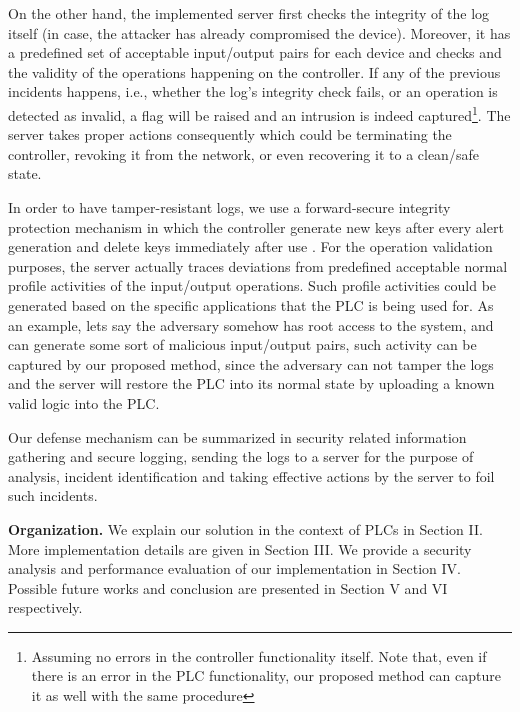 On the other hand, the implemented server first checks the integrity of the log itself (in case, the attacker has already compromised the device). Moreover, it has a predefined set of acceptable input/output pairs for each device and checks and the validity of the operations happening on the controller. If any of the previous incidents happens, i.e., whether the log's integrity check fails, or an operation is detected as invalid, a flag will be raised and an intrusion is indeed captured\footnote{Assuming no errors in the controller functionality itself. Note that, even if there is an error in the PLC functionality, our proposed method can capture it as well with the same procedure}. The server takes proper actions consequently which could be terminating the controller, revoking it from the network, or even recovering it to a clean/safe state.

In order to have tamper-resistant logs, we use a forward-secure integrity protection mechanism in which the controller generate new keys after every alert generation and delete keys immediately after use \cite{pillarbox}. For the operation validation purposes, the server actually traces deviations from predefined acceptable normal profile activities of the input/output operations. Such profile activities could be generated based on the specific applications that the PLC is being used for. As an example, lets say the adversary somehow has root access to the system, and can generate some sort of malicious input/output pairs, such activity can be captured by our proposed method, since the adversary can not tamper the logs and the server will restore the PLC into its normal state by uploading a known valid logic into the PLC.

Our defense mechanism can be summarized in security related information gathering and secure logging, sending the logs to a server for the purpose of analysis, incident identification and taking effective actions by the server to foil such incidents. 

\textbf{Organization. }We explain our solution in the context of PLCs in Section II. More implementation details are given in Section III. We provide a security analysis and performance evaluation of our implementation in Section IV. Possible future works and conclusion are presented in Section V and VI respectively. 

